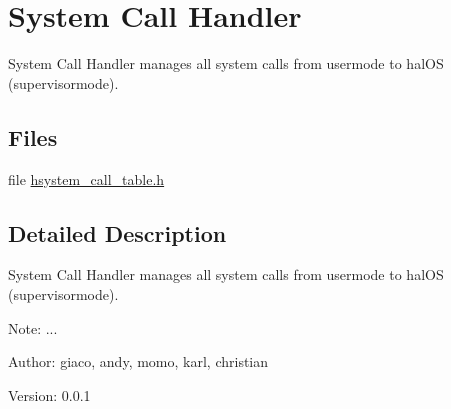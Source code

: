 \hypertarget{group___s_y_s_t_e_m___c_a_l_l___h_a_n_d_l_e_r}{
\section{System Call Handler}
\label{group___s_y_s_t_e_m___c_a_l_l___h_a_n_d_l_e_r}
}
System Call Handler manages all system calls from usermode to halOS (supervisormode).  


\subsection*{Files}
\begin{CompactItemize}
\item 
file \hyperlink{hsystem__call__table_8h}{hsystem\_\-call\_\-table.h}
\end{CompactItemize}


\subsection{Detailed Description}
System Call Handler manages all system calls from usermode to halOS (supervisormode). 

\begin{Desc}
\item[Note:]... \end{Desc}
\begin{Desc}
\item[Author:]giaco, andy, momo, karl, christian \end{Desc}
\begin{Desc}
\item[Version:]0.0.1 \end{Desc}
